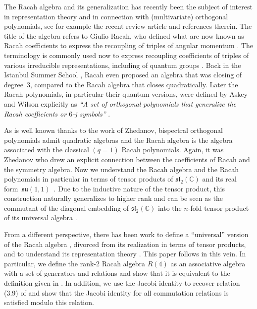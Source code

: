 \documentclass[pdftex]{sigma}
\numberwithin{equation}{section}
\begin{document}
The Racah algebra and its generalization has recently been the subject of interest in representation theory and in connection with (multivariate) orthogonal polynomials, see for example the recent review article \cite{Vinet2020} and references therein. The title of the algebra refers to Giulio Racah, who defined what are now known as Racah coefficients to express the recoupling of triples of angular momentum \cite{Racah}. The terminology is commonly used now to express recoupling coefficients of triples of various irreducible representations, including of quantum groups \cite{Kirillov, Levy,Louck}. Back in the Istanbul Summer School \cite{Racah2}, Racah even proposed an algebra that was closing of degree~3, compared to the Racah algebra that closes quadratically. Later the Racah polynomials, in particular their quantum versions, were defined by Askey and Wilson explicitly as {\it ``A set of orthogonal polynomials that generalize the Racah coefficients or $6$-j symbols''} \cite{Askey}.

As is well known thanks to the work of Zhedanov, bispectral orthogonal polynomials admit quadratic algebras \cite{GLZ} and the Racah algebra is the algebra associated with the classical ${(q=1)}$ Racah polynomials. Again, it was Zhedanov \cite{GZ88} who drew an explicit connection between the coefficients of Racah and the symmetry algebra. Now we understand the Racah algebra and the Racah polynomials in particular in terms of tensor products of $\mathfrak{sl}_2(\mathbb{C})$ and its real form~$\mathfrak{su}(1,1)$~\cite{GVZ2013,GZ93, SP}. Due to the inductive nature of the tensor product, this construction naturally generalizes to higher rank \cite{BGVV2018,Vinet2020} and can be seen as the commutant of the diagonal embedding of $\mathfrak{sl}_2(\mathbb{C})$ into the $n$-fold tensor product of its universal algebra \cite{CGPAV22}.

From a different perspective, there has been work to define a ``universal'' version of the Racah algebra \cite{BCH2020,CGPAV22}, divorced from its realization in terms of tensor products, and to understand its representation theory \cite{HBC2020}. This paper follows in this vein. In particular, we define the rank-2 Racah algebra $R(4)$ as an associative algebra with a set of generators and relations and show that it is equivalent to the definition given in \cite{CGPAV22}. In addition, we use the Jacobi identity to recover relation (3.9) of \cite{CGPAV22} and show that the Jacobi identity for all commutation relations is satisfied modulo this relation.
\end{document}
